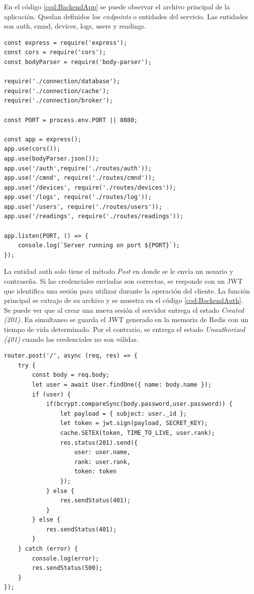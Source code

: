 En el código \ref{cod:BackendApp} se puede observar el archivo principal de la aplicación.
Quedan definidos los \emph{endpoints} o entidades del servicio.
Las entidades son auth, cmnd, devices, logs, users y readings.

\newpage

\begin{lstlisting}[label=cod:BackendApp,caption=Archivo principal del servicio Backend]
const express = require('express');
const cors = require('cors');
const bodyParser = require('body-parser');

require('./connection/database');
require('./connection/cache');
require('./connection/broker');

const PORT = process.env.PORT || 8080;

const app = express();
app.use(cors());
app.use(bodyParser.json());
app.use('/auth',require('./routes/auth'));
app.use('/cmnd', require('./routes/cmnd'));
app.use('/devices', require('./routes/devices'));
app.use('/logs', require('./routes/log'));
app.use('/users', require('./routes/users'));
app.use('/readings', require('./routes/readings'));

app.listen(PORT, () => { 
    console.log(`Server running on port ${PORT}`); 
});
\end{lstlisting}

La entidad auth solo tiene el método \emph{Post} en donde se le envía un usuario y contraseña.
Si las credenciales enviadas son correctas, se responde con un JWT que identifica una sesión para utilizar durante la operación del cliente.
La función principal se extrajo de su archivo y se muestra en el código \ref{cod:BackendAuth}.
Se puede ver que al crear una nueva sesión el servidor entrega el estado \emph{Created (201)}.
En simultaneo se guarda el JWT generado en la memoria de Redis con un tiempo de vida determinado.
Por el contrario, se entrega el estado \emph{Unauthorized (401)} cuando las credenciales no son válidas.

\begin{lstlisting}[label=cod:BackendAuth,caption=Función principal de la entidad auth]
router.post('/', async (req, res) => {
    try {
        const body = req.body;
        let user = await User.findOne({ name: body.name });
        if (user) {
            if(bcrypt.compareSync(body.password,user.password)) {
                let payload = { subject: user._id };
                let token = jwt.sign(payload, SECRET_KEY);
                cache.SETEX(token, TIME_TO_LIVE, user.rank);
                res.status(201).send({
                    user: user.name,
                    rank: user.rank,
                    token: token
                });
            } else {
                res.sendStatus(401);
            }
        } else {
            res.sendStatus(401);
        }
    } catch (error) {
        console.log(error);
        res.sendStatus(500);
    }
});
\end{lstlisting}

